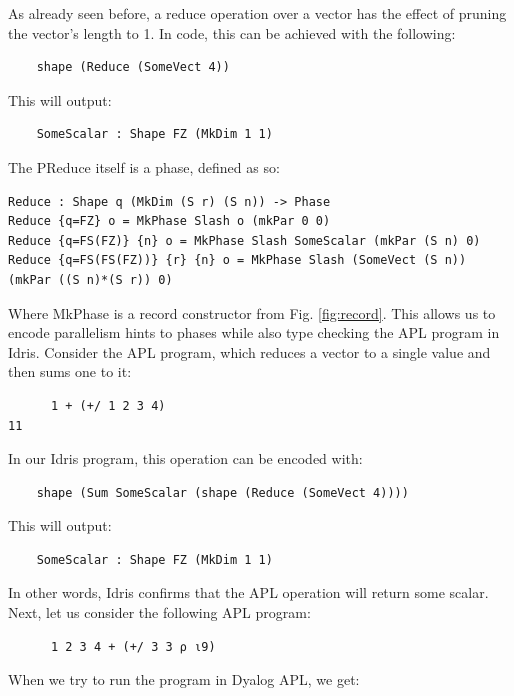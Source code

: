 \documentclass{report}
\begin{document}
As already seen before, a reduce operation over a vector has the effect of pruning the vector's length to 1. In code, this can be achieved with the following:

\begin{verbatim}
    shape (Reduce (SomeVect 4))
\end{verbatim}

This will output:

\begin{verbatim}
    SomeScalar : Shape FZ (MkDim 1 1)
\end{verbatim}

The PReduce itself is a phase, defined as so:

\begin{verbatim}
Reduce : Shape q (MkDim (S r) (S n)) -> Phase
Reduce {q=FZ} o = MkPhase Slash o (mkPar 0 0)
Reduce {q=FS(FZ)} {n} o = MkPhase Slash SomeScalar (mkPar (S n) 0)
Reduce {q=FS(FS(FZ))} {r} {n} o = MkPhase Slash (SomeVect (S n)) (mkPar ((S n)*(S r)) 0)
\end{verbatim}

Where MkPhase is a record constructor from Fig. \ref{fig:record}. This allows us to encode parallelism hints to phases while also type checking the APL program in Idris. Consider the APL program, which reduces a vector to a single value and then sums one to it:

\begin{verbatim}
      1 + (+/ 1 2 3 4)
11
\end{verbatim}

In our Idris program, this operation can be encoded with:

\begin{verbatim}
    shape (Sum SomeScalar (shape (Reduce (SomeVect 4))))
\end{verbatim}

This will output:

\begin{verbatim}
    SomeScalar : Shape FZ (MkDim 1 1)
\end{verbatim}

In other words, Idris confirms that the APL operation will return some scalar. Next, let us consider the following APL program:

\begin{verbatim}
      1 2 3 4 + (+/ 3 3 ⍴ ⍳9)
\end{verbatim}

When we try to run the program in Dyalog APL, we get:
\end{document}
